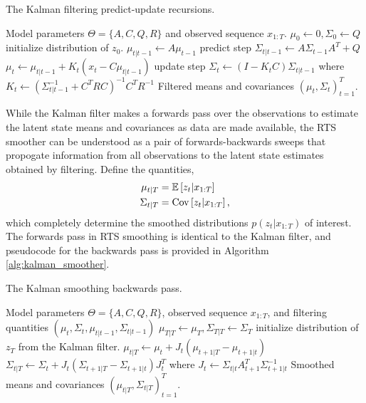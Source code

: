 \documentclass[14pt]{extarticle}
\begin{document}
\begin{algorithm}
   \caption{The Kalman filtering predict-update recursions.}
   \label{alg:kalman_filter}
\begin{algorithmic}
   Model parameters $\Theta = \{A, C, Q, R\}$ and
    observed sequence $x_{1:T}$.
    \STATE $\mu_{0} \leftarrow 0, \Sigma_{0} \leftarrow Q$ \hfill initialize distribution of
    $z_{0}$.
    \STATE $\mu_{t \vert t - 1} \leftarrow A\mu_{t - 1}$ \hfill predict step
    \STATE $\Sigma_{t \vert t - 1} \leftarrow A \Sigma_{t - 1} A^{T} + Q$
    \STATE $\mu_{t} \leftarrow \mu_{t \vert t - 1} + K_{t}\left(x_{t} - C\mu_{t \vert t - 1}\right)$ \hfill update step
    \STATE $\Sigma_{t} \leftarrow \left(I - K_{t}C\right)\Sigma_{t \vert t - 1}$
    \STATE where $K_{t} \leftarrow \left(\Sigma_{t \vert t - 1}^{-1} + C^{T}R C\right)^{-1} C^{T}R^{-1}$
    \ENDFOR
     Filtered means and covariances $\left(\mu_{t},
    \Sigma_{t}\right)_{t = 1}^{T}$.
\end{algorithmic}
\end{algorithm}
While the Kalman filter makes a forwards pass over the observations to estimate
the latent state means and covariances as data are made available, the RTS
smoother can be understood as a pair of forwards-backwards sweeps that propogate
information from all observations to the latent state estimates obtained by
filtering. Define the quantities,
\begin{align*}
\mu_{t \vert T} &= \mathbb{E}\left[{z_{t} \vert x_{1:T}}\right] \\
\Sigma_{t \vert T} &= \mathrm{Cov}\left[{z_{t} \vert x_{1:T}}\right],
\end{align*}
which completely determine the smoothed distributions $p\left(z_{t} \vert
x_{1:T}\right)$ of interest. The forwards pass in RTS smoothing is identical to
the Kalman filter, and pseudocode for the backwards pass is provided in
Algorithm \ref{alg:kalman_smoother}.

\begin{algorithm}
   \caption{The Kalman smoothing backwards pass.}
   \label{alg:kalman_smoother}
\begin{algorithmic}
   Model parameters $\Theta = \{A, C, Q, R\}$,
    observed sequence $x_{1:T}$, and filtering quantities $\left(\mu_{t},
    \Sigma_{t}, \mu_{t \vert t - 1}, \Sigma_{t \vert t - 1}\right)$
    \STATE $\mu_{T \vert T} \leftarrow \mu_{T}, \Sigma_{T \vert T} \leftarrow
    \Sigma_{T}$ \hfill initialize distribution of $z_{T}$ from the Kalman
    filter.
    \STATE $\mu_{t \vert T} \leftarrow \mu_{t} + J_{t}\left(\mu_{t + 1 \vert T} - \mu_{t + 1 \vert t}\right)$
    \STATE $\Sigma_{t \vert T} \leftarrow \Sigma_{t} + J_{t}\left(\Sigma_{t + 1 \vert T} - \Sigma_{t + 1 \vert t}\right)J_{t}^{T}$
    \STATE where $J_{t} \leftarrow \Sigma_{t \vert t}A_{t + 1}^{T} \Sigma_{t + 1\vert t}^{-1}$
    \ENDFOR
     Smoothed means and covariances $\left(\mu_{t \vert T},
    \Sigma_{t \vert T}\right)_{t = 1}^{T}$.
\end{algorithmic}
\end{algorithm}
\end{document}
